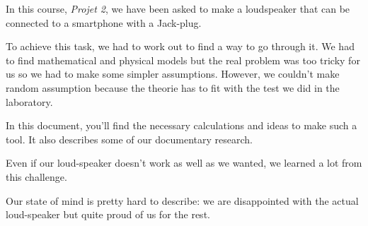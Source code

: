 

\begin{abstract-en}


In this course, \textit{Projet 2}, we have been asked to make a loudspeaker that can be connected to a smartphone with a Jack-plug.

To achieve this task, we had to work out to find a way to go through it.
We had to find mathematical and physical models but the real problem was too tricky for us so we had to make some simpler assumptions.
However, we couldn't make random assumption because the theorie has to fit with the test we did in the laboratory.

In this document, you'll find the necessary calculations and ideas to make such a tool. It also describes some
of our documentary research.

Even if our loud-speaker doesn't work as well as we wanted, we learned a lot from this challenge. 

Our state of mind is pretty hard to describe: we are disappointed with the actual loud-speaker but quite proud of us for the rest.


\end{abstract-en}


